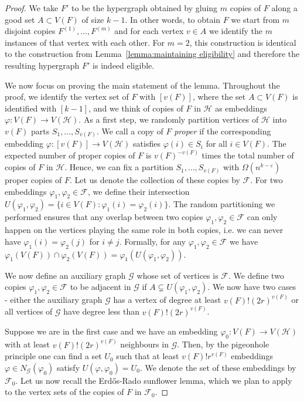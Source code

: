 \documentclass[11pt]{article}
\numberwithin{equation}{section}
\def\eps{\varepsilon}
\def\cF{\mathcal{F}}
\def\cG{\mathcal{G}}
\def\cH{\mathcal{H}}
\theoremstyle{plain}
\theoremstyle{remark}
\begin{document}
\begin{proof}
We take $F'$ to be the hypergraph obtained by gluing $m$ copies of $F$ along a good set $A\subset V(F)$ of size $k-1$. In other words, to obtain $F$ we start from $m$ disjoint copies $F^{(1)}, \dots, F^{(m)}$ and for each vertex $v\in A$ we identify the $m$ instances of that vertex with each other. For $m=2$, this construction is identical to the construction from Lemma~\ref{lemma:maintaining eligibility} and therefore the resulting hypergraph $F'$ is indeed eligible. 

We now focus on proving the main statement of the lemma. Throughout the proof, we identify the vertex set of $F$ with $[v(F)]$, where the set $A \subset V(F)$ is identified with $[k-1]$, and we think of copies of $F$ in $\cH$ as embeddings $\varphi:V(F)\to V(\cH)$. As a first step, we randomly partition vertices of $\cH$ into $v(F)$ parts $S_1, \dots, S_{v(F)}$. We call a copy of $F$ \textit{proper} if the corresponding embedding $\varphi:[v(F)]\to V(\cH)$ satisfies $\varphi(i)\in S_i$ for all $i\in V(F)$. The expected number of proper copies of $F$ is $v(F)^{-v(F)}$ times the total number of copies of $F$ in $\cH$. Hence, we can fix a partition $S_1, \dots, S_{v(F)}$ with $\Omega(n^{k-\eps})$ proper copies of $F$. Let us denote the collection of these copies by $\cF$. For two embeddings $\varphi_1, \varphi_2\in \cF$, we define their intersection $U(\varphi_1, \varphi_2)=\{i\in V(F):\varphi_1(i)=\varphi_2(i)\}$. The random partitioning we performed ensures that any overlap between two copies $\varphi_1, \varphi_2\in \cF$ can only happen on the vertices playing the same role in both copies, i.e. we can never have $\varphi_1(i)=\varphi_2(j)$ for $i\neq j$. Formally, for any $\varphi_1, \varphi_2\in \cF$ we have $\varphi_1(V(F))\cap \varphi_2(V(F))=\varphi_1(U(\varphi_1, \varphi_2))$.

We now define an auxiliary graph $\cG$ whose set of vertices is $\cF$. We define two copies $\varphi_1, \varphi_2\in \cF$ to be adjacent in $\cG$ if $A\subsetneq U(\varphi_1, \varphi_2)$. We now have two cases - either the auxiliary graph $\cG$ has a vertex of degree at least $v(F)!(2r)^{v(F)}$ or all vertices of $\cG$ have degree less than $v(F)!(2r)^{v(F)}$.

Suppose we are in the first case and we have an embedding $\varphi_0:V(F)\to V(\cH)$ with at least $v(F)!(2r)^{v(F)}$ neighbours in $\cG$. Then, by the pigeonhole principle one can find a set $U_0$ such that at least $v(F)!r^{v(F)}$ embeddings $\varphi\in N_{\cG}(\varphi_0)$ satisfy $U(\varphi, \varphi_0)=U_0$. We denote the set of these embeddings by $\cF_0$. Let us now recall the Erd\H{o}s-Rado sunflower lemma, which we plan to apply to the vertex sets of the copies of $F$ in $\cF_0$.


\end{proof}
\end{document}
